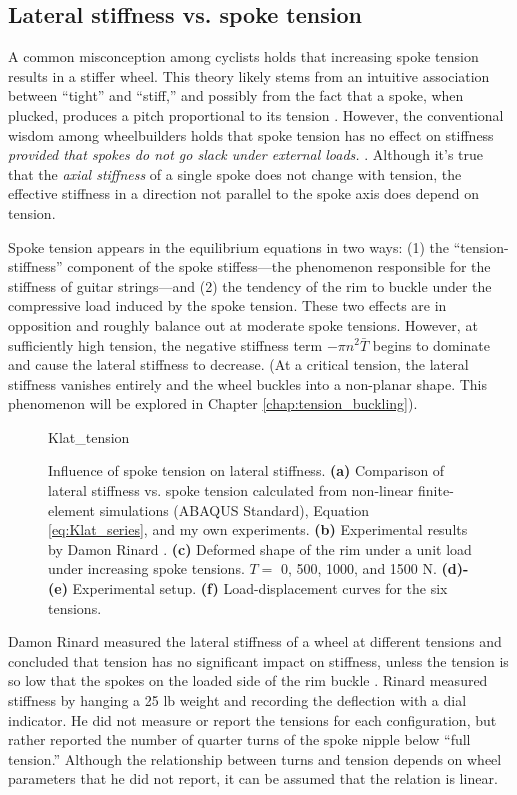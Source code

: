 \documentclass[\rootdir/thesis.tex]{subfiles}
\begin{document}
\subsection{Lateral stiffness vs. spoke tension}

A common misconception among cyclists holds that increasing spoke tension results in a stiffer wheel. This theory likely stems from an intuitive association between ``tight'' and ``stiff,'' and possibly from the fact that a spoke, when plucked, produces a pitch proportional to its tension \cite{Allen1997}. However, the conventional wisdom among wheelbuilders holds that spoke tension has no effect on stiffness \emph{provided that spokes do not go slack under external loads.} \cite{Rinard,Kopecky2013,Hjertberg2014}. Although it's true that the \emph{axial stiffness} of a single spoke does not change with tension, the effective stiffness in a direction not parallel to the spoke axis does depend on tension.

Spoke tension appears in the equilibrium equations in two ways: (1) the ``tension-stiffness'' component of the spoke stiffess---the phenomenon responsible for the stiffness of guitar strings---and (2) the tendency of the rim to buckle under the compressive load induced by the spoke tension. These two effects are in opposition and roughly balance out at moderate spoke tensions. However, at sufficiently high tension, the negative stiffness term $-\pi n^2 \bar{T}$ begins to dominate and cause the lateral stiffness to decrease. (At a critical tension, the lateral stiffness vanishes entirely and the wheel buckles into a non-planar shape. This phenomenon will be explored in Chapter \ref{chap:tension_buckling}).

\begin{figure}[h]
\centering
{Klat_tension}
\caption{Influence of spoke tension on lateral stiffness. \textbf{(a)} Comparison of lateral stiffness vs. spoke tension calculated from non-linear finite-element simulations (ABAQUS Standard), Equation \eqref{eq:Klat_series}, and my own experiments. \textbf{(b)} Experimental results by Damon Rinard \cite{Rinard}. \textbf{(c)} Deformed shape of the rim under a unit load under increasing spoke tensions. $T=\,\,$0, 500, 1000, and 1500 N. \textbf{(d)-(e)} Experimental setup. \textbf{(f)} Load-displacement curves for the six tensions.}
\label{fig:Klat_tension}
\end{figure}

Damon Rinard measured the lateral stiffness of a wheel at different tensions and concluded that tension has no significant impact on stiffness, unless the tension is so low that the spokes on the loaded side of the rim buckle \cite{Rinard}. Rinard measured stiffness by hanging a 25 lb weight and recording the deflection with a dial indicator. He did not measure or report the tensions for each configuration, but rather reported the number of quarter turns of the spoke nipple below ``full tension.'' Although the relationship between turns and tension depends on wheel parameters that he did not report, it can be assumed that the relation is linear.
\end{document}
